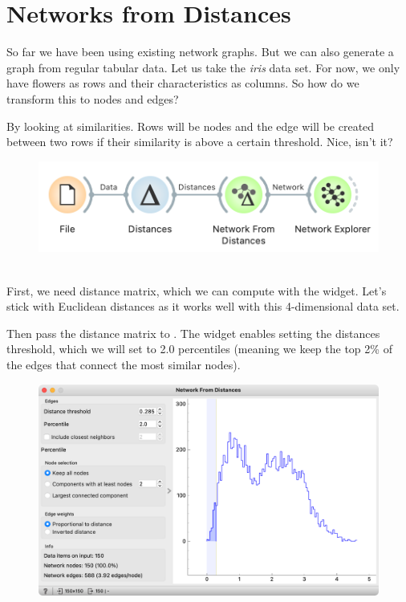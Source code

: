 \chapter{Networks from Distances}

So far we have been using existing network graphs. But we can also generate a graph from regular tabular data. Let us take the \emph{iris} data set. For now, we only have flowers as rows and their characteristics as columns. So how do we transform this to nodes and edges?

By looking at similarities. Rows will be nodes and the edge will be created between two rows if their similarity is above a certain threshold. Nice, isn't it?

\begin{figure}[h]
    \centering
    \includegraphics[width=\linewidth]{workflow.png}
    \caption{$\;$}
\end{figure}

First, we need distance matrix, which we can compute with the  widget. Let's stick with Euclidean distances as it works well with this 4-dimensional data set.

Then pass the distance matrix to . The widget enables setting the distances threshold, which we will set to 2.0 percentiles (meaning we keep the top 2\% of the edges that connect the most similar nodes).

\begin{figure}[h]
    \centering
    \includegraphics[scale=0.45]{net-from-distances.png}
    \caption{$\;$}
\end{figure}

